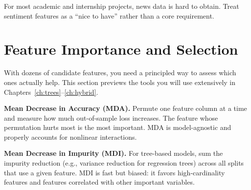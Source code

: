 For most academic and internship projects, news data is hard to obtain.
Treat sentiment features as a ``nice to have'' rather than a core requirement.

\section{Feature Importance and Selection}\label{sec:feat-importance}

With dozens of candidate features, you need a principled way to assess which ones actually help.
This section previews the tools you will use extensively in Chapters~\ref{ch:trees}--\ref{ch:hybrid}.

\textbf{Mean Decrease in Accuracy (MDA).}
Permute one feature column at a time and measure how much out-of-sample loss increases.
The feature whose permutation hurts most is the most important.
MDA is model-agnostic and properly accounts for nonlinear interactions.

\textbf{Mean Decrease in Impurity (MDI).}
For tree-based models, sum the impurity reduction (e.g., variance reduction for regression trees) across all splits that use a given feature.
MDI is fast but biased: it favors high-cardinality features and features correlated with other important variables.

